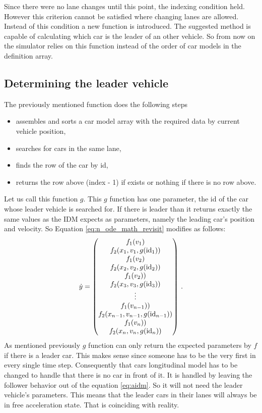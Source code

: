 		Since there were no lane changes until this point, the indexing condition held. However this criterion cannot be satisfied where changing lanes are allowed. Instead of this condition a new function is introduced. The suggested method is capable of calculating which car is the leader of an other vehicle. So from now on the simulator relies on this function instead of the order of car models in the definition array.
		\subsection*{Determining the leader vehicle}
		The previously mentioned function does the following steps
		\begin{itemize}
			\item assembles and sorts a car model array with the required data by current vehicle position,
			\item searches for cars in the same lane,
			\item finds the row of the car by id,
			\item returns the row above (index - 1) if exists or nothing if there is no row above.
		\end{itemize}
		Let us call this function $g$. This $g$ function has one parameter, the id of the car whose leader vehicle is searched for. If there is leader than it returns exactly the same values as the IDM expects as parameters, namely the leading car's position and velocity.
		So Equation \ref{eq:n_ode_math_revisit} modifies as follows:
		\begin{equation}
			\dot{y}=
			\begin{pmatrix}
			f_1(v_1)\\
			f_2(x_{1}, v_{1},g({\rm id}_1))\\
			f_1(v_2)\\
			f_2(x_{2}, v_{2},g({\rm id}_2))\\
			f_1(v_2))\\
			f_2(x_{3}, v_{3},g({\rm id}_3))\\
			\vdots\\
			f_1(v_{n-1}))\\
			f_2(x_{n-1}, v_{n-1},g({\rm id}_{n-1}))\\
			f_1(v_n))\\
			f_2(x_{n}, v_{n},g({\rm id}_{n}))
			\end{pmatrix}\,.
			\label{eq:n_ode_math_with_find_leading}
		\end{equation}
		As mentioned previously $g$ function can only return the expected parameters by $f$ if there is a leader car. This makes sense since someone has to be the very first in every single time step. Consequently that cars longitudinal model has to be changed to handle that there is no car in front of it. It is handled by leaving the follower behavior out of the equation \ref{eq:aidm}. So it will not need the leader vehicle's parameters. This means that the leader cars in their lanes will always be in free acceleration state. That is coinciding with reality. 
